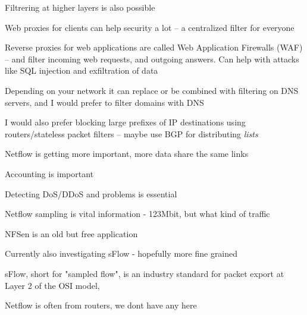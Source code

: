 \documentclass[Screen16to9,17pt]{foils}
\begin{document}

\begin{list2}
\item Filtrering at higher layers is also possible
\item Web proxies for clients can help security a lot -- a centralized filter for everyone

\item Reverse proxies for web applications are called
Web Application Firewalls (WAF) -- and filter incoming web requests, and outgoing answers. Can help with attacks like SQL injection and exfiltration of data
\item Depending on your network it can replace or be combined with filtering on DNS servers, and I would prefer to filter domains with DNS
\item I would also prefer blocking large prefixes of IP destinations using routers/stateless packet filters -- maybe use BGP for distributing \emph{lists}
\end{list2}



\begin{list2}
\item Netflow is getting more important, more data share the same links
\item Accounting is important
\item Detecting DoS/DDoS and problems is essential
\item Netflow sampling is vital information - 123Mbit, but what kind of traffic
\item NFSen is an old but free application
\item Currently also investigating sFlow - hopefully more fine grained
\item sFlow, short for "sampled flow", is an industry standard for packet export at Layer 2 of the OSI model, \\
\end{list2}

\centerline{Netflow is often from routers, we dont have any here}

\end{document}
